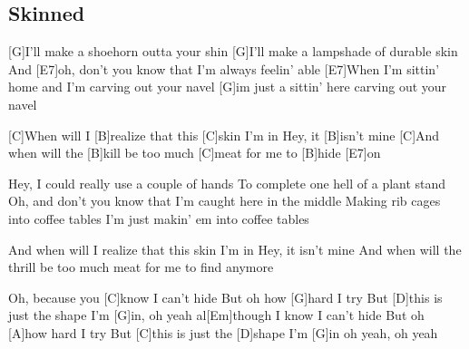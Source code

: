 \subsection*{Skinned   }



\begin{guitar}


[G]I'll make a shoehorn outta your shin
[G]I'll make a lampshade of durable skin
And [E7]oh, don't you know that I'm always feelin' able
[E7]When I'm sittin' home and I'm carving out your navel
[G]im just a sittin' here carving out your navel


[C]When will I [B]realize that this [C]skin I'm in
Hey, it [B]isn't mine
[C]And when will the [B]kill be too much [C]meat for me to [B]hide [E7]on


Hey, I could really use a couple of hands
To complete one hell of a plant stand
Oh, and don't you know that I'm caught here in the middle
Making rib cages into coffee tables
I'm just makin' em into coffee tables

And when will I realize that this skin I'm in
Hey, it isn't mine
And when will the thrill be too much meat for me to find anymore



Oh, because you [C]know I can't hide
But oh how [G]hard I try
But [D]this is just the shape I'm [G]in, oh yeah
al[Em]though I know I can't hide
But oh [A]how hard I try
But [C]this is just the [D]shape I'm [G]in
oh yeah, oh yeah

\end{guitar}
